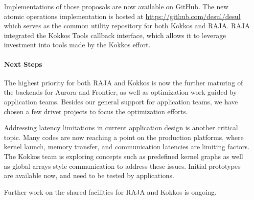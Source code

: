 Implementations of those proposals are now available on GitHub. 
The new atomic operations implementation is hosted at \url{https://github.com/desul/desul} which serves as the common utility repository for both Kokkos and RAJA.
RAJA integrated the Kokkos Tools callback interface, which allows it to leverage investment into tools made by the Kokkos effort.

\paragraph{Next Steps}

The highest priority for both RAJA and Kokkos is now the further maturing of the backends for Aurora and Frontier, as well as optimization work guided by application teams.
Besides our general support for application teams, we have chosen a few driver projects to focus the optimization efforts.

Addressing latency limitations in current application design is another critical topic.
Many codes are now reaching a point on the production platforms, where kernel launch, memory transfer, and communication latencies are limiting factors.
The Kokkos team is exploring concepts such as predefined kernel graphs as well as global arrays style communication to address these issues.
Initial prototypes are available now, and need to be tested by applications.

Further work on the shared facilities for RAJA and Kokkos is ongoing.

